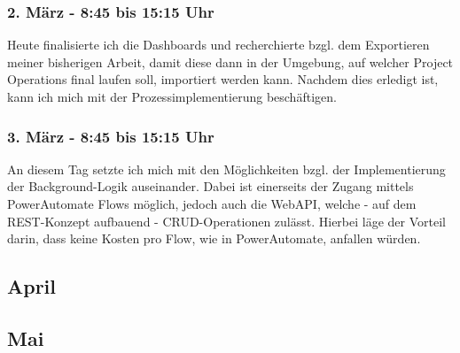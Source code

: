\subsubsection*{2. März - 8:45 bis 15:15 Uhr}
Heute finalisierte ich die Dashboards und recherchierte bzgl. dem Exportieren meiner bisherigen Arbeit, damit diese dann in der Umgebung, auf welcher Project Operations final laufen soll, importiert werden kann. Nachdem dies erledigt ist, kann ich mich mit der Prozessimplementierung beschäftigen.

\subsubsection*{3. März - 8:45 bis 15:15 Uhr}
An diesem Tag setzte ich mich mit den Möglichkeiten bzgl. der Implementierung der Background-Logik auseinander. Dabei ist einerseits der Zugang mittels PowerAutomate Flows möglich, jedoch auch die WebAPI, welche - auf dem REST-Konzept aufbauend - CRUD-Operationen zulässt. Hierbei läge der Vorteil darin, dass keine Kosten pro Flow, wie in PowerAutomate, anfallen würden.

\subsection{April}

\subsection{Mai}

